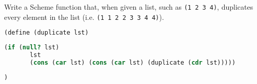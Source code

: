 \question Write a Scheme function that, when given a list, such as {\tt (1 2 3
4)}, duplicates every element in the list (i.e. {\tt (1 1 2 2 3 3 4 4)}).
\begin{lstlisting}[language=Scheme]
(define (duplicate lst)
\end{lstlisting}
\begin{solution}[1in]
\begin{lstlisting}[language=Scheme]
   (if (null? lst)
       lst
       (cons (car lst) (cons (car lst) (duplicate (cdr lst)))))
\end{lstlisting}
\end{solution}
\begin{lstlisting}[language=Scheme]
                                             )
\end{lstlisting}
